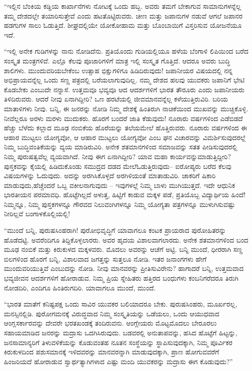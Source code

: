  “ಇಲ್ಲಿನ ಬೆಂಕಿಯ ಕಡ್ಡಿಯ ಕಾರ್ಖಾನೆಗಳು ನೋಟಕ್ಕೆ ಒಂದು ಹಬ್ಬ. ಅವರು ತಮಗೆ ಬೇಕಾಗುವ ಸಾಮಾನುಗಳನ್ನೆಲ್ಲ ತಮ್ಮ ದೇಶದಲ್ಲೇ ತಯಾರಿಸುತ್ತೇವೆ ಎಂದು ಹಟತೊಟ್ಟಿರುವರು. ಚೀಣ ಮತ್ತು ಜಪಾನುಗಳ ನಡುವೆ ಆಗಲೆ ಜಪಾನರ ಹಡಗುಗಳ ಸಾಲು ಓಡುತ್ತಿದೆ. ಶೀಘ್ರದಲ್ಲಿಯೇ ಯೋಕೋಹಾಮ ಮತ್ತು ಬೊಂಬಾಯಿಗೆ ವಿಸ್ತರಿಸುವ ಯೋಜನೆಯೂ ಇದೆ.

 “ಇಲ್ಲಿ ಅನೇಕ ಗುಡಿಗಳನ್ನು ನಾನು ನೋಡಿದೆನು. ಪ್ರತಿಯೊಂದು ಗುಡಿಯಲ್ಲಿಯೂ ಹಳೆಯ ಬೆಂಗಾಳಿ ಲಿಪಿಯಿಂದ ಬರೆದ ಸಂಸ್ಕೃತ ಮಂತ್ರಗಳಿವೆ. ಎಲ್ಲೊ ಕೆಲವು ಪೂಜಾರಿಗಳಿಗೆ ಮಾತ್ರ ಇಲ್ಲಿ ಸಂಸ್ಕೃತ ಗೊತ್ತಿದೆ. ಆದರೂ ಅವರು ಬುದ್ಧಿ ಶಾಲಿಗಳು. ಮುಂದುವರಿಯಬೇಕೆಂಬ ಉತ್ಸಾಹ ಭಿಕ್ಷುಗಳಿಗೂ ಹಿಡಿದಿರುವುದು! ಜಪಾನೀಯರ ವಿಷಯದಲ್ಲಿ ನನ್ನ ಅಭಿಪ್ರಾಯವನ್ನೆಲ್ಲ ಒಂದು ಸಣ್ಣ ಪತ್ರದಲ್ಲಿ ಬರೆಯಲಾಗುವುದಿಲ್ಲ. ನಮ್ಮ ದೇಶದ ಹಲವು ಯುವಕರು ಜಪಾನಿಗೆ ಭೇಟಿ ಕೊಡಬೇಕು ಎಂಬುದೇ ನನ್ನಾಸೆ. ಉತ್ತಮವೂ ಭವ್ಯವೂ ಆದ ಆದರ್ಶಗಳಿಗೆ ಭಾರತ ತೌರೂರು ಎಂದು ಜಪಾನೀಯರು ತಿಳಿದಿರುವರು. ಆದರೆ ನೀವು ಏನಾಗಿದ್ದೀರಿ? ಒಣ ಹರಟೆಯಲ್ಲಿ ಜೀವಮಾನವನ್ನೆಲ್ಲ ಕಳೆಯುತ್ತಿರುವಿರಿ. ಬರಿಯ ಮಾತಾಳಿಗಳು ನೀವು. ಬನ್ನಿ, ಈ ಜನರನ್ನು ನೋಡಿ ನಿಮ್ಮ ದೇಶಕ್ಕೆ ಹಿಂತಿರುಗಿ ನಾಚಿಕೆಯಿಂದ ಮುಖವನ್ನು ಮುಚ್ಚಿಕೊಳ್ಳಿ. ನೀವೆಲ್ಲರೂ ಅರಳು ಮರಳು ಮುದುಕರು. ಹೊರಗೆ ಬಂದರೆ ಜಾತಿ ಕೆಡುವುದು! ನೂರಾರು ವರ್ಷಗಳಿಂದ ಎಡೆಬಿಡದೆ ಹೆಚ್ಚು ಬೆಳೆದು ಕಲ್ಲಾದ ಮೂಢ ನಂಬಿಕೆಯ ಹೊರೆಯನ್ನು ತಲೆಯಮೇಲೆ ಹೊತ್ತಿರುವರು. ನೂರಾರು ವರ್ಷಗಳಿಂದ ಈ ಆಹಾರ ಮುಟ್ಟಲು ಯೋಗ್ಯವೋ, ಆ ಆಹಾರ ಮುಟ್ಟಲು ಯೋಗ್ಯವೋ ಎಂಬ ಘನ ವಿಚಾರವನ್ನು ವಿಮರ್ಶಿಸುವುದರಲ್ಲೆ ನಿಮ್ಮ ಬುದ್ಧಿವಂತಿಕೆಯನ್ನು ವ್ಯಯ ಮಾಡಿರುವಿರಿ. ಅನೇಕ ಶತಮಾನಗಳಿಂದ ಸಮಾಜವನ್ನು ಸತತ ಪೀಡಿಸುವುದರಲ್ಲಿ ನಿಮ್ಮ ಪುರುಷತ್ವವೆಲ್ಲ ವ್ಯಯವಾಗಿದೆ. ನೀವು ಈಗ ಏನಾಗಿದ್ದೀರಿ? ಯಾವ ಮಹಾ ಕಾರ್ಯವನ್ನು\break ಮಾಡುತ್ತಿದ್ದೀರಿ? ಪುಸ್ತಕವನ್ನು ಕೈಯಲ್ಲಿ ಹಿಡಿದುಕೊಂಡು ಸಮುದ್ರದ ದಡದ ಮೇಲೆ\break ಓಡುತ್ತಿರುವುದು– ಐರೋಪ್ಯರು ಬರೆದ ಕೆಲವು ವಿಷಯಗಳನ್ನು ಓದುವುದು. ಅದನ್ನು ಅರಗಿಸಿಕೊಳ್ಳದೆ ಅರಗಿಳಿಯಂತೆ ಮಾತಾಡುವಿರಿ. ಚಾಕರಿಗೆ ಷಿಕಾರಿ ಮಾಡುವುದು,\break ಹೆಚ್ಚೆಂದರೆ ಒಬ್ಬ ವಕೀಲನಾಗುವುದು – ಇವುಗಳಲ್ಲೆ ನಿಮ್ಮ ಬಾಳು ಮುಗಿಯುತ್ತದೆ. ಇದೇ ಆಧುನಿಕ ಭಾರತೀಯನ ಪರಮಾವಧಿ. ಹೊಟ್ಟೆಗಿಲ್ಲದೆ ಅಳುತ್ತ, ಹಿಟ್ಟಿಗೆ ಕಾಡುವ ಮಕ್ಕಳ ಪಡೆ, ಪ್ರತಿಯೊಬ್ಬ ವಿದ್ಯಾರ್ಥಿಯ ಹಿಂದೆ! ನಿಮ್ಮನ್ನೂ, ನಿಮ್ಮ ಪುಸ್ತಕಗಳನ್ನೂ ಗೌರವದ ನಿಲುವಂಗಿಗಳನ್ನೂ ನಿಮ್ಮ ಯೋಗ್ಯತಾ ಪತ್ರಗಳನ್ನೂ ಮುಳುಗಿಸುವಷ್ಟು ನೀರಿಲ್ಲವೆ ಬಂಗಾಳಕೊಲ್ಲಿಯಲ್ಲಿ!

 “ಮುಂದೆ ಬನ್ನಿ, ಪುರುಷಸಿಂಹರಾಗಿ! ಪುರೋಭಿವೃದ್ಧಿಗೆ ಯಾವಾಗಲೂ ಕಂಟಕ ಪ್ರಾಯರಾದ ಪುರೋಹಿತರನ್ನು ಹೊಡೆದಟ್ಟಿ. ಅವರೆಂದಿಗೂ ತಿದ್ದಿಕೊಳ್ಳಲಾರರು. ಅವರ ಹೃದಯ ವಿಶಾಲವಾಗಲಾರದು. ಅನೇಕ ಶತಮಾನಗಳಿಂದ ಬಂದ ಮೂಢ ನಂಬಿಕೆ ಮತ್ತು ಕಿರುಕುಳದ ಮಕ್ಕಳವರು. ಮೊದಲು ಅವರನ್ನು ಆಚೆಗೆ ಅಟ್ಟಿ. ಬನ್ನಿ ಮುಂದೆ, ಧೀರರಾಗಿ ಸಣ್ಣ ಬಿಲಗಳಿಂದ ಹೊರಗೆ ಬನ್ನಿ, ವಿಶಾಲವಾದ ಜಗತ್ತನ್ನು ಸುತ್ತಲೂ ನೋಡಿ. ಇತರ ಜನಾಂಗಗಳು ಹೇಗೆ ಮುಂದುವರಿಯುತ್ತಿವೆ ಎಂಬುದನ್ನು ನೋಡಿ. ನೀವು ಮಾನವರನ್ನು ಪ್ರೀತಿಸುವಿರೇನು? ಹಾಗಾದರೆ ಬನ್ನಿ, ಉತ್ತಮವಾದ ಭವ್ಯಜೀವನ ಆದರ್ಶಗಳಿಗೆ ಹೋರಾಡುವ. ನಿಮ್ಮ ಪ್ರಿಯ ಸ್ನೇಹಿತರು ಹತ್ತಿರದ ಬಂಧುಗಳು ಕಂಬನಿಗರೆದರೂ ತಿರುಗಿ ನೋಡದಿರಿ, ಎಂದಿಗೂ ಹಿಂತಿರುಗದಿರಿ. ಯಾವಾಗಲೂ ಮುಂದೆ, ಮುಂದೆ.

 “ಭಾರತ ಮಾತೆಗೆ ಕನಿಷ್ಟಪಕ್ಷ ಒಂದು ಸಾವಿರ ಯುವಕರ ಬಲಿಯಾದರೂ ಬೇಕು. ಪುರುಷಸಿಂಹರು, ಮೂರ್ಖರಲ್ಲ, ಮನಸ್ಸಿನಲ್ಲಿಡಿ. ಪುರೋಗಮನಕ್ಕೆ ವಿರುದ್ಧವಾದ ನಿಮ್ಮ ಸಂಸ್ಕೃತಿಯನ್ನು ಒಡೆಯಲು, ಒಂದು ಆಯುಧವಾದ ಆಂಗ್ಲಸರ್ಕಾರವನ್ನು ದೇವರೇ ಭರತಖಂಡಕ್ಕೆ ತಂದಿರುವನು. ಆಂಗ್ಲೇಯರು ಮೊಟ್ಟಮೊದಲು ಬೇರೂರಲು ಸಹಾಯಮಾಡಿದ ಜನರನ್ನು ಮದ್ರಾಸು ಒದಗಿಸಿರುವುದು. ಬಡವರಲ್ಲಿ ಅನುತಾಪವನ್ನು, ಹಸಿದ ಹೊಟ್ಟೆಗೆ ಹಿಟ್ಟನ್ನು, ಜನಸಾಮಾನ್ಯರಿಗೆ ತಿಳುವಳಿಕೆಯನ್ನು ಕೊಡುವಂತಹ ನೂತನ ಸಂಸ್ಥೆಯನ್ನು ಸ್ಥಾಪಿಸುವುದಕ್ಕಾಗಿ, ನಿಮ್ಮ ಪೂರ್ವಿಕರ ಕಿರುಕುಳದಿಂದ ಪಶುಸಮಾನಕ್ಕೆ ಇಳಿದವರನ್ನು ಮಾನವರನ್ನಾಗಿ ಮಾಡುವುದಕ್ಕಾಗಿ, ಪ್ರಾಣ ಹೋಗುವವರೆಗೆ ಹಿಂಜರಿಯದೆ ಹೋರಾಡುವ ಸ್ವಾರ್ಥತ್ಯಾಗಿಗಳಾದ ಎಷ್ಟು ಮಂದಿ ಯುವಕರನ್ನು ಮದ್ರಾಸು ಈಗ ಕೊಡುವುದು?” 

